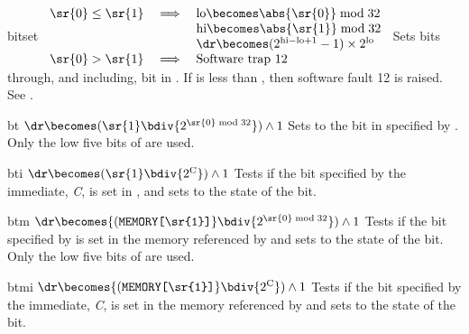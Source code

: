 \begin{instruction}{bitset}
     {
       \begin{math}
         \begin{array}{rcl}
           \sr{0} \leq \sr{1} & \implies & \textrm{lo} \becomes \abs{\sr{0}} \bmod 32        \\
                              &          & \textrm{hi} \becomes \abs{\sr{1}} \bmod 32        \\
                              &          & \dr \becomes (2^{\textrm{hi} - \textrm{lo} + 1} - 1) \times 2^\textrm{lo} \\
           \sr{0} >    \sr{1} & \implies & \textrm{Software trap 12}
         \end{array}
       \end{math}
     }
     {
       Sets bits  through, and including, bit  in \dr.
       If  is less than , then software fault 12 is
       raised.  See .
     }
\end{instruction}


\begin{instruction}{bt}
     {
       $\dr \becomes ({\sr{1}} \bdiv {2^{\textrm{\sr{0}} \bmod 32}}) \wedge 1$
     }
     {
       Sets \dr to the bit in  specified by .  Only the low
       five bits of  are used.
     }
\end{instruction}


\begin{instruction}{bti}
     {\btcropc}
     {
       $\dr \becomes ({\sr{1}} \bdiv {2^{\textrm{C}}}) \wedge 1$
     }
     {
       Tests if the bit specified by the immediate, \emph{C}, is set
       in , and sets \dr to the state of the bit.
     }
\end{instruction}


\begin{instruction}{btm}
     {\btmopc}
     {
       $\dr \becomes {(\texttt{MEMORY[\sr{1}]}} \bdiv {2^{\sr{0} \bmod 32}}) \wedge  1$
     }
     {
       Tests if the bit specified by  is set in the memory
       referenced by  and sets \dr to the state of the bit.  Only
       the low five bits of  are used.
     }
\end{instruction}


\begin{instruction}{btmi}
    {
      $\dr \becomes {(\texttt{MEMORY[\sr{1}]}} \bdiv {2^{\textrm{C}}}) \wedge  1$
    }
    {
      Tests if the bit specified by the immediate, \emph{C}, is set in
      the memory referenced by  and sets \dr to the state of the
      bit.
    }
\end{instruction}


